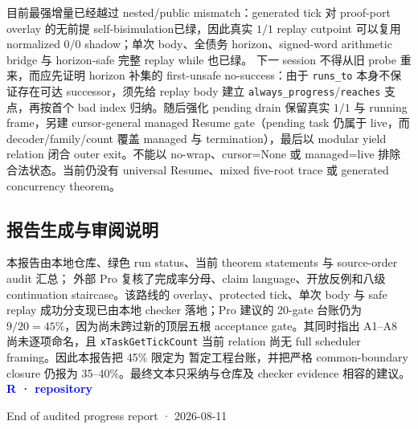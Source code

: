 \documentclass[11pt,a4paper,UTF8]{ctexart}
\newcommand{\repoev}{\colorbox{paleBlue}{\textcolor{blue}{\textbf{R · repository}}}}
\newcommand{\code}[1]{\nolinkurl{#1}}
\begin{document}
目前最强增量已经越过 nested/public mismatch：generated tick 对 proof-port overlay 的无前提
self-bisimulation已绿，因此真实 $1/1$ replay cutpoint 可以复用 normalized $0/0$ shadow；单次
body、全债务 horizon、signed-word arithmetic bridge 与 horizon-safe 完整 replay while 也已绿。
下一 session 不得从旧 probe 重来，而应先证明 horizon 补集的 first-unsafe no-success：由于
\code{runs_to} 本身不保证存在可达 successor，须先给 replay body 建立
\code{always_progress}/\code{reaches} 支点，再按首个 bad index 归纳。随后强化 pending drain
保留真实 $1/1$ 与 running frame，另建 cursor-general managed Resume gate（pending task 仍属于
live，而 decoder/family/count 覆盖 managed 与 termination），最后以 modular yield relation
闭合 outer exit。不能以 no-wrap、cursor=None 或 managed=live 排除合法状态。当前仍没有
universal Resume、mixed five-root trace 或 generated concurrency theorem。

\subsection{报告生成与审阅说明}

本报告由本地仓库、绿色 run status、当前 theorem statements 与 source-order audit 汇总；
外部 Pro 复核了完成率分母、claim language、开放反例和八级 continuation staircase。该路线的
overlay、protected tick、单次 body 与 safe replay 成功分支现已由本地 checker 落地；Pro 建议的
20-gate 台账仍为 $9/20=45\%$，因为尚未跨过新的顶层五根 acceptance gate。其同时指出 A1--A8 尚未逐项命名，且
\code{xTaskGetTickCount} 当前 relation 尚无 full scheduler framing。因此本报告把 45\% 限定为
暂定工程台账，并把严格 common-boundary closure 仍报为 35--40\%。最终文本只采纳与仓库及
checker evidence 相容的建议。\repoev

\vfill
\begin{center}
  \color{muted}\small
  End of audited progress report · 2026-08-11
\end{center}
\end{document}
